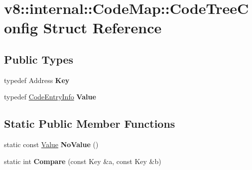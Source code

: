 \hypertarget{structv8_1_1internal_1_1_code_map_1_1_code_tree_config}{}\section{v8\+:\+:internal\+:\+:Code\+Map\+:\+:Code\+Tree\+Config Struct Reference}
\label{structv8_1_1internal_1_1_code_map_1_1_code_tree_config}
\subsection*{Public Types}
\begin{DoxyCompactItemize}
\item 
typedef Address {\bfseries Key}\hypertarget{structv8_1_1internal_1_1_code_map_1_1_code_tree_config_a30caf661ad7d12f7d37b8c01766b3db9}{}\label{structv8_1_1internal_1_1_code_map_1_1_code_tree_config_a30caf661ad7d12f7d37b8c01766b3db9}

\item 
typedef \hyperlink{structv8_1_1internal_1_1_code_map_1_1_code_entry_info}{Code\+Entry\+Info} {\bfseries Value}\hypertarget{structv8_1_1internal_1_1_code_map_1_1_code_tree_config_aae6c623611a0d26fb507d3faba0c467d}{}\label{structv8_1_1internal_1_1_code_map_1_1_code_tree_config_aae6c623611a0d26fb507d3faba0c467d}

\end{DoxyCompactItemize}
\subsection*{Static Public Member Functions}
\begin{DoxyCompactItemize}
\item 
static const \hyperlink{structv8_1_1internal_1_1_code_map_1_1_code_entry_info}{Value} {\bfseries No\+Value} ()\hypertarget{structv8_1_1internal_1_1_code_map_1_1_code_tree_config_afd2c870f87392f3437e855a4da4de077}{}\label{structv8_1_1internal_1_1_code_map_1_1_code_tree_config_afd2c870f87392f3437e855a4da4de077}

\item 
static int {\bfseries Compare} (const Key \&a, const Key \&b)\hypertarget{structv8_1_1internal_1_1_code_map_1_1_code_tree_config_a4e5cfec63423ed16ce6ae7ded9994a00}{}\label{structv8_1_1internal_1_1_code_map_1_1_code_tree_config_a4e5cfec63423ed16ce6ae7ded9994a00}

\end{DoxyCompactItemize}
